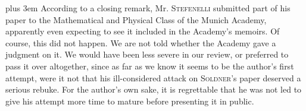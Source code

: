 \begingroup\rightskip=0pt plus 3em
According to a closing remark, Mr. \textsc{Stefenelli} submitted part of his paper to the Mathematical and Physical Class of the Munich Academy, apparently even expecting to see it included in the Academy's memoirs. Of course, this did not happen. We are not told whether the Academy gave a judgment on it. We would have been less severe in our review, or preferred to pass it over altogether, since as far as we know it seems to be the author's first attempt, were it not that his ill-considered attack on \textsc{Soldner}'s paper deserved a serious rebuke. For the author's own sake, it is regrettable that he was not led to give his attempt more time to mature before presenting it in public.\par\endgroup
